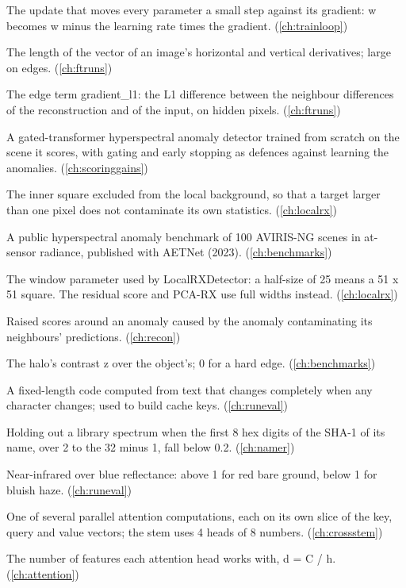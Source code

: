 \begin{description}[style=nextline,leftmargin=1.2em,font=\normalfont\bfseries]
\item[Gradient descent] The update that moves every parameter a small step against its gradient: w becomes w minus the learning rate times the gradient. (\cref{ch:trainloop})
\item[Gradient magnitude] The length of the vector of an image's horizontal and vertical derivatives; large on edges. (\cref{ch:ftruns})
\item[Gradient-matching loss] The edge term gradient\_l1: the L1 difference between the neighbour differences of the reconstruction and of the input, on hidden pixels. (\cref{ch:ftruns})
\item[GT-HAD] A gated-transformer hyperspectral anomaly detector trained from scratch on the scene it scores, with gating and early stopping as defences against learning the anomalies. (\cref{ch:scoringgains})
\item[Guard window] The inner square excluded from the local background, so that a target larger than one pixel does not contaminate its own statistics. (\cref{ch:localrx})
\item[HAD100] A public hyperspectral anomaly benchmark of 100 AVIRIS-NG scenes in at-sensor radiance, published with AETNet (2023). (\cref{ch:benchmarks})
\item[Half-size] The window parameter used by LocalRXDetector: a half-size of 25 means a 51 x 51 square. The residual score and PCA-RX use full widths instead. (\cref{ch:localrx})
\item[Halo] Raised scores around an anomaly caused by the anomaly contaminating its neighbours' predictions. (\cref{ch:recon})
\item[Halo ratio] The halo's contrast z over the object's; 0 for a hard edge. (\cref{ch:benchmarks})
\item[Hash] A fixed-length code computed from text that changes completely when any character changes; used to build cache keys. (\cref{ch:runeval})
\item[Hash split] Holding out a library spectrum when the first 8 hex digits of the SHA-1 of its name, over 2 to the 32 minus 1, fall below 0.2. (\cref{ch:namer})
\item[Haze colour test] Near-infrared over blue reflectance: above 1 for red bare ground, below 1 for bluish haze. (\cref{ch:runeval})
\item[Head] One of several parallel attention computations, each on its own slice of the key, query and value vectors; the stem uses 4 heads of 8 numbers. (\cref{ch:crossstem})
\item[Head dimension] The number of features each attention head works with, d = C / h. (\cref{ch:attention})

\end{description}
